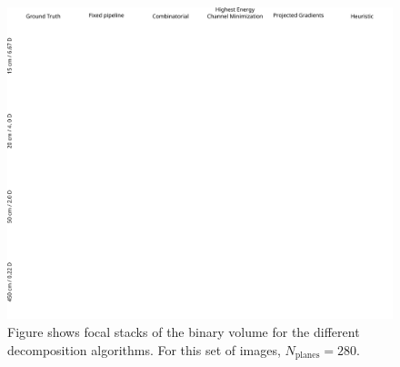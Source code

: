 \begin{figure}[!htb]
\centering
\includegraphics[width=0.99\columnwidth]{images/volumetric/acd_exp1/exp_FS}
\caption[Adaptive color decomposition: focal stack]{Figure shows focal stacks of the binary volume for the different decomposition algorithms. For this set of images, $N_{\text{planes}}=280$.}
\label{fig:volumetric:acd:exp1:focalstack}
\end{figure}

